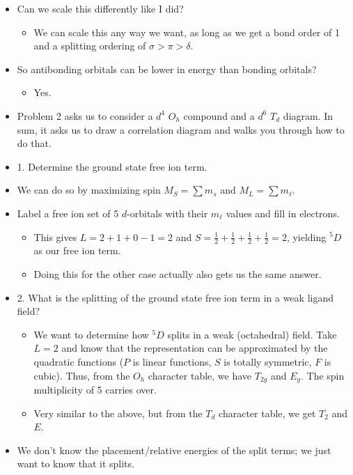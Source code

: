 \documentclass[../notes.tex]{subfiles}
\begin{document}
\begin{itemize}
    \item Can we scale this differently like I did?
    \begin{itemize}
        \item We can scale this any way we want, as long as we get a bond order of 1 and a splitting ordering of $\sigma>\pi>\delta$.
    \end{itemize}
    \item So antibonding orbitals can be lower in energy than bonding orbitals?
    \begin{itemize}
        \item Yes.
    \end{itemize}
    \item Problem 2 asks us to consider a $d^4$ $O_h$ compound and a $d^6$ $T_d$ diagram. In sum, it asks us to draw a correlation diagram and walks you through how to do that.
    \item 1. Determine the ground state free ion term.
    \item We can do so by maximizing spin $M_S=\sum m_s$ and $M_L=\sum m_\ell$.
    \item Label a free ion set of 5 $d$-orbitals with their $m_\ell$ values and fill in electrons.
    \begin{itemize}
        \item This gives $L=2+1+0-1=2$ and $S=\frac{1}{2}+\frac{1}{2}+\frac{1}{2}+\frac{1}{2}=2$, yielding ${}^5D$ as our free ion term.
        \item Doing this for the other case actually also gets us the same answer.
    \end{itemize}
    \item 2. What is the splitting of the ground state free ion term in a weak ligand field?
    \begin{itemize}
        \item We want to determine how ${}^5D$ splits in a weak (octahedral) field. Take $L=2$ and know that the representation can be approximated by the quadratic functions ($P$ is linear functions, $S$ is totally symmetric, $F$ is cubic). Thus, from the $O_h$ character table, we have $T_{2g}$ and $E_g$. The spin multiplicity of 5 carries over.
        \item Very similar to the above, but from the $T_d$ character table, we get $T_2$ and $E$.
    \end{itemize}
    \item We don't know the placement/relative energies of the split terms; we just want to know that it splits.

\end{itemize}
\end{document}
